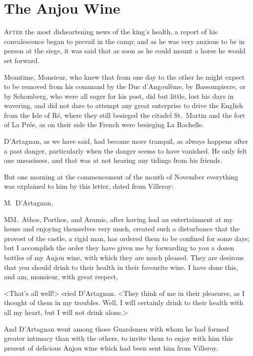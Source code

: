 
\chapter{The Anjou Wine}

\lettrine{A}{fter} the most disheartening news of the king's health, a report of his convalescence began to prevail in the camp; and as he was very anxious to be in person at the siege, it was said that as soon as he could mount a horse he would set forward. 

Meantime, Monsieur, who knew that from one day to the other he might expect to be removed from his command by the Duc d'Angoulême, by Bassompierre, or by Schomberg, who were all eager for his post, did but little, lost his days in wavering, and did not dare to attempt any great enterprise to drive the English from the Isle of Ré, where they still besieged the citadel St.~Martin and the fort of La Prée, as on their side the French were besieging La Rochelle. 

D'Artagnan, as we have said, had become more tranquil, as always happens after a past danger, particularly when the danger seems to have vanished. He only felt one uneasiness, and that was at not hearing any tidings from his friends. 

But one morning at the commencement of the month of November everything was explained to him by this letter, dated from Villeroy: 
\begin{mail}{}{M.~D'Artagnan,} 
	
	MM.~Athos, Porthos, and Aramis, after having had an entertainment at my house and enjoying themselves very much, created such a disturbance that the provost of the castle, a rigid man, has ordered them to be confined for some days; but I accomplish the order they have given me by forwarding to you a dozen bottles of my Anjou wine, with which they are much pleased. They are desirous that you should drink to their health in their favourite wine. I have done this, and am, monsieur, with great respect, 
	\end{mail}

<That's all well!> cried D'Artagnan. <They think of me in their pleasures, as I thought of them in my troubles. Well, I will certainly drink to their health with all my heart, but I will not drink alone.> 

And D'Artagnan went among those Guardsmen with whom he had formed greater intimacy than with the others, to invite them to enjoy with him this present of delicious Anjou wine which had been sent him from Villeroy. 

